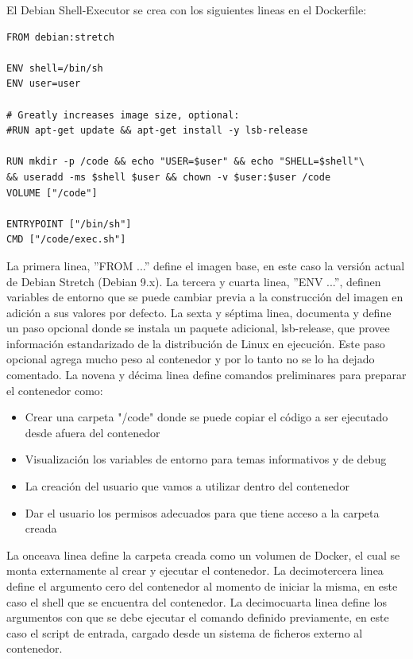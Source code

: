 El Debian Shell-Executor se crea con los siguientes lineas en el Dockerfile: 
\begin{lstlisting}
FROM debian:stretch

ENV shell=/bin/sh
ENV user=user

# Greatly increases image size, optional:
#RUN apt-get update && apt-get install -y lsb-release

RUN mkdir -p /code && echo "USER=$user" && echo "SHELL=$shell"\
&& useradd -ms $shell $user && chown -v $user:$user /code
VOLUME ["/code"]

ENTRYPOINT ["/bin/sh"]
CMD ["/code/exec.sh"]
\end{lstlisting}
La primera linea, ''FROM ...'' define el imagen base, en este caso la versión actual de Debian Stretch (Debian 9.x). La tercera y cuarta linea, ''ENV ...'', definen variables de entorno que se puede cambiar previa a la construcción del imagen en adición a sus valores por defecto. La sexta y séptima linea, documenta y define un paso opcional donde se instala un paquete adicional, lsb-release, que provee información estandarizado de la distribución de Linux en ejecución. Este paso opcional agrega mucho peso al contenedor y por lo tanto no se lo ha dejado comentado. La novena y décima linea define comandos preliminares para preparar el contenedor como:
\begin{itemize}
	\item Crear una carpeta "/code" donde se puede copiar el código a ser ejecutado desde afuera del contenedor
	\item Visualización los variables de entorno para temas informativos y de debug
	\item La creación del usuario que vamos a utilizar dentro del contenedor
	\item Dar el usuario los permisos adecuados para que tiene acceso a la carpeta creada
\end{itemize}
La onceava linea define la carpeta creada como un volumen de Docker, el cual se monta externamente al crear y ejecutar el contenedor. La decimotercera linea define el argumento cero del contenedor al momento de iniciar la misma, en este caso el shell que se encuentra del contenedor. La decimocuarta linea define los argumentos con que se debe ejecutar el comando definido previamente, en este caso el script de entrada, cargado desde un sistema de ficheros externo al contenedor.

